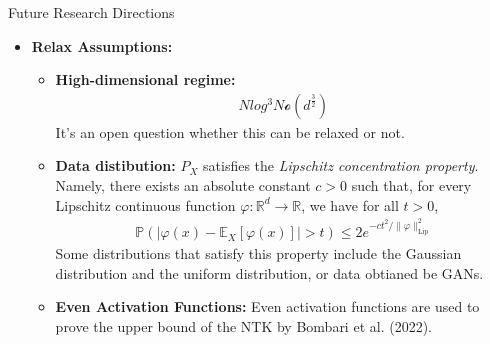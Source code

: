 \documentclass[serif, aspectratio=169]{beamer}
\begin{document}
\begin{frame}{Future Research Directions}
	\begin{itemize}
		\item \textbf{Relax Assumptions:}
		\begin{itemize}
			\item \textbf{High-dimensional regime: }
			\begin{align*}
				N log^{3} N \mathcal{o}(d^{\frac{3}{2}})
			\end{align*}
			It's an open question whether this can be relaxed or not.
			\item \textbf{Data distibution: }
			$P_X$ satisfies the \textit{Lipschitz concentration property}. Namely, there exists an absolute constant $c > 0$ such that, for every Lipschitz continuous function $\varphi : \mathbb{R}^d \to \mathbb{R}$, we have for all $t > 0$,
			\begin{align*}
				\mathbb{P}\left( \left| \varphi(x) - \mathbb{E}_X[\varphi(x)] \right| > t \right) \leq 2e^{-ct^2 / \|\varphi\|_{\text{Lip}}^2}
			\end{align*}
			Some distributions that satisfy this property include the Gaussian distribution and the uniform distribution, or data obtianed be GANs.
			\item \textbf{Even Activation Functions: }
			Even activation functions are used to prove the upper bound of the NTK by Bombari et al. (2022).  
		\end{itemize}
	\end{itemize}
\end{frame}
\end{document}
